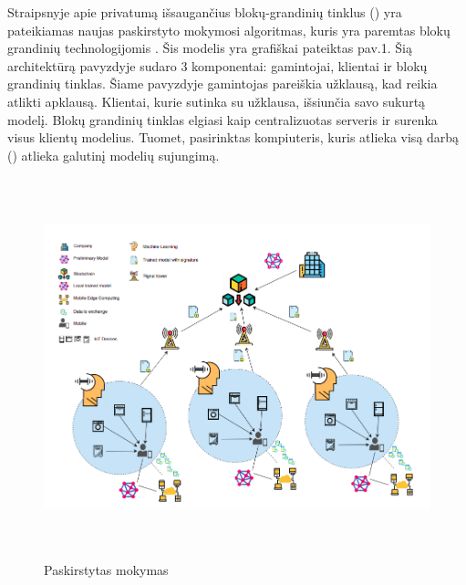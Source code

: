 \documentclass{VUMIFInfBakalaurinis}
\begin{document}
	\par Straipsnyje apie privatumą išsaugančius blokų-grandinių tinklus () yra pateikiamas naujas paskirstyto mokymosi algoritmas, kuris yra paremtas
blokų grandinių technologijomis \cite{5}. Šis modelis yra grafiškai pateiktas pav.1. Šią architektūrą pavyzdyje sudaro 3 komponentai: gamintojai, klientai ir blokų grandinių tinklas. Šiame pavyzdyje gamintojas pareiškia užklausą, kad reikia atlikti apklausą. Klientai, kurie sutinka su užklausa, išsiunčia savo sukurtą modelį. Blokų grandinių tinklas elgiasi kaip centralizuotas serveris ir surenka visus klientų modelius. Tuomet, pasirinktas kompiuteris, kuris atlieka visą darbą () atlieka galutinį modelių sujungimą.

\begin{figure}[ht]
  \centering
  \includegraphics[width=13cm,height=11cm,keepaspectratio]{img/paskirstytasMokymasis.png}
  \caption{Paskirstytas mokymas \cite{5}}
  \label{fig:overflowProblem}
\end{figure}
\end{document}
